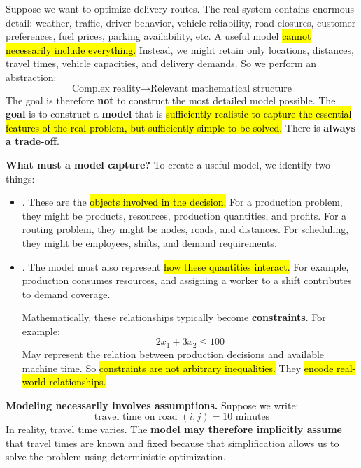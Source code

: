 \highspace
Suppose we want to optimize delivery routes. The real system contains enormous detail: weather, traffic, driver behavior, vehicle reliability, road closures, customer preferences, fuel prices, parking availability, etc. A useful model \hl{cannot necessarily include everything.} Instead, we might retain only locations, distances, travel times, vehicle capacities, and delivery demands. So we perform an abstraction:
\begin{equation*}
    \text{Complex reality}
    \longrightarrow
    \text{Relevant mathematical structure}
\end{equation*}
The goal is therefore \textbf{not} to construct the most detailed model possible. The \textbf{goal} is to construct a \textbf{model} that is \hl{sufficiently realistic to capture the essential features of the real problem, but sufficiently simple to be solved.} There is \textbf{always a trade-off}.

\highspace
\textcolor{Green3}{ \textbf{What must a model capture?}} To create a useful model, we identify two things:
\begin{itemize}
    \item {}. These are the \hl{objects involved in the decision.} For a production problem, they might be products, resources, production quantities, and profits. For a routing problem, they might be nodes, roads, and distances. For scheduling, they might be employees, shifts, and demand requirements.

    \item {}. The model must also represent \hl{how these quantities interact.} For example, production consumes resources, and assigning a worker to a shift contributes to demand coverage.

        \highspace
        Mathematically, these relationships typically become \textbf{constraints}. For example:
        \begin{equation*}
            2x_1+3x_2\le 100
        \end{equation*}
        May represent the relation between production decisions and available machine time. So \hl{constraints are not arbitrary inequalities.} They \hl{encode real-world relationships.}
\end{itemize}
\textcolor{Green3}{ \textbf{Modeling necessarily involves assumptions.}} Suppose we write:
\begin{equation*}
    \text{travel time on road }(i,j)=10\text{ minutes}
\end{equation*}
In reality, travel time varies. The \textbf{model may therefore implicitly assume} that travel times are known and fixed because that simplification allows us to solve the problem using deterministic optimization.

